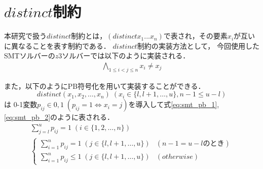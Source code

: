 \section{$distinct$制約}


本研究で扱う$distinct$制約とは，$(distinct x_1 ... x_n)$で表され，その要素$x_i$が互いに異なることを表す制約である．
$distinct$制約の実装方法として，
今回使用したSMTソルバーの$z3ソルバー$では以下のように実装される．
\begin{eqnarray*}
    \bigwedge_{1 \leq i < j \leq n} x_i \neq x_j
\end{eqnarray*}

また，以下のようにPB符号化を用いて実装することができる．
\\
$$distinct(x_1, x_2,\ldots, x_n) \; (x_i \in \{l,l+1,\ldots,u\}, n-1 \leq u-l)$$
は
0-1変数$p_{ij} \in {0,1} \; (p_{ij}=1 \Leftrightarrow x_i=j)$を導入して式\ref{eq:smt_pb_1},\ref{eq:smt_pb_2}のように表される．
\begin{eqnarray}
    \sum_{j=l}^{u} p_{ij}=1 \; (i \in \{1,2,\ldots,n\}) \label{eq:smt_pb_1}\\
    \begin{cases}
        \sum_{i=1}^{n} p_{ij} = 1 \; (j \in \{l,l+1,\ldots,u\}) & (n-1=u-lのとき) \\
        \sum_{i=1}^{n} p_{ij} \leq 1 \; (j \in \{l,l+1,\ldots,u\}) & (otherwise)
    \end{cases}\label{eq:smt_pb_2}
\end{eqnarray}

